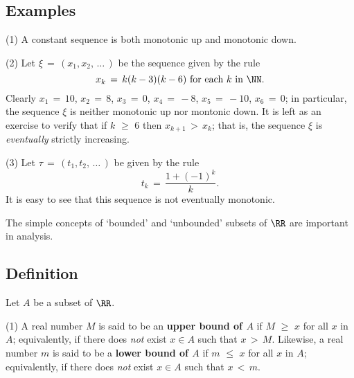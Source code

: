             \subsection{\small{\bf Examples}}
            \label{ExampB20.190}

\V

\hspace*{\parindent}(1) A constant sequence is both monotonic up and monotonic down.

\V

        (2) Let ${\xi} \,=\, (x_{1},x_{2},\,{\ldots}\,)$ be the sequence given by the rule
        \begin{displaymath}
        x_{k} \,=\, k(k-3)(k-6) \mbox{ for each $k$ in ${\NN}$}.
        \end{displaymath}
    Clearly $x_{1} \,=\, 10$, $x_{2} \,=\, 8$, $x_{3} \,=\, 0$, $x_{4} \,=\, -8$, $x_{5} \,=\, -10$, $x_{6} \,=\, 0$;
    in particular, the sequence ${\xi}$ is neither monotonic up nor montonic down.
    It is left as an exercise to verify that if $k\,\,{\geq}\,\,6$ then $x_{k+1}\,>\,x_{k}$;
    that is, the sequence ${\xi}$ is {\em eventually} strictly increasing.


\V

        (3) Let ${\tau} \,=\, (t_{1},t_{2},\,{\ldots}\,)$ be given by the rule
        \begin{displaymath}
        t_{k} \,=\, \frac{1+(-1)^{k}}{k}.
        \end{displaymath}
    It is easy to see that this sequence is not eventually monotonic.



\V
\V

        The simple concepts of `bounded' and `unbounded' subsets of ${\RR}$ are important in analysis.

            \subsection{\small{\bf Definition}}
            \label{DefB20.195A}

        Let $A$ be a subset of ${\RR}$.

\V

        (1) A real number $M$ is said to be an {\bf upper bound of $A$} if $M\,\,{\geq}\,\,x$ for all $x$ in $A$;
    equivalently, if there does {\em not} exist $x{\in}A$ such that $x\,>\,M$. Likewise, a real number $m$ is said to be a {\bf lower bound of $A$}
     if $m\,\,{\leq}\,\,x$ for all $x$ in $A$; equivalently, if there does {\em not} exist $x{\in}A$ such that $x\,<\,m$.


